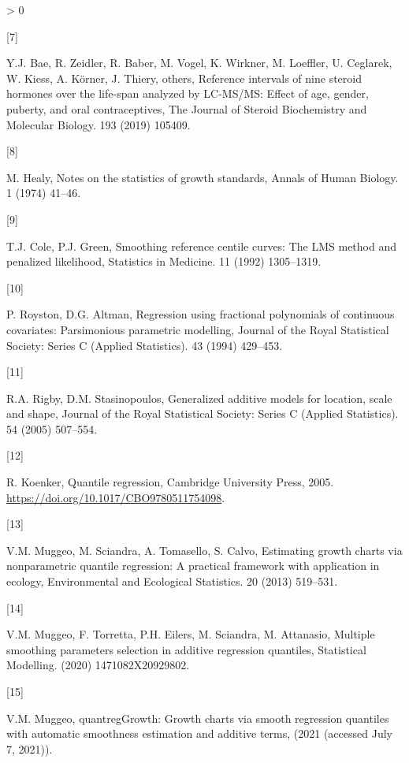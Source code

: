 \documentclass[]{elsarticle} %
\newlength{\csllabelwidth}
\newlength{\cslhangindent}
\newenvironment{CSLReferences}[3] %
 {%
  \setlength{\parindent}{0pt}
  \ifodd #1 \everypar{\setlength{\hangindent}{\cslhangindent}}\ignorespaces\fi
  \ifnum #2 > 0
  \setlength{\parskip}{#2\baselineskip}
  \fi
 }%
 {}
\newcommand{\CSLLeftMargin}[1]{\parbox[t]{\csllabelwidth}{#1}}
\newcommand{\CSLRightInline}[1]{\parbox[t]{\linewidth - \csllabelwidth}{#1}}
\begin{document}
\begin{CSLReferences}{0}{0}
\leavevmode\hypertarget{ref-bae2019reference}{}%
\CSLLeftMargin{{[}7{]} }
\CSLRightInline{Y.J. Bae, R. Zeidler, R. Baber, M. Vogel, K. Wirkner, M.
Loeffler, U. Ceglarek, W. Kiess, A. Körner, J. Thiery, others, Reference
intervals of nine steroid hormones over the life-span analyzed by
LC-MS/MS: Effect of age, gender, puberty, and oral contraceptives, The
Journal of Steroid Biochemistry and Molecular Biology. 193 (2019)
105409.}

\leavevmode\hypertarget{ref-healy1974notes}{}%
\CSLLeftMargin{{[}8{]} }
\CSLRightInline{M. Healy, Notes on the statistics of growth standards,
Annals of Human Biology. 1 (1974) 41--46.}

\leavevmode\hypertarget{ref-cole1992smoothing}{}%
\CSLLeftMargin{{[}9{]} }
\CSLRightInline{T.J. Cole, P.J. Green, Smoothing reference centile
curves: The LMS method and penalized likelihood, Statistics in Medicine.
11 (1992) 1305--1319.}

\leavevmode\hypertarget{ref-royston1994regression}{}%
\CSLLeftMargin{{[}10{]} }
\CSLRightInline{P. Royston, D.G. Altman, Regression using fractional
polynomials of continuous covariates: Parsimonious parametric modelling,
Journal of the Royal Statistical Society: Series C (Applied Statistics).
43 (1994) 429--453.}

\leavevmode\hypertarget{ref-rigby2005generalized}{}%
\CSLLeftMargin{{[}11{]} }
\CSLRightInline{R.A. Rigby, D.M. Stasinopoulos, Generalized additive
models for location, scale and shape, Journal of the Royal Statistical
Society: Series C (Applied Statistics). 54 (2005) 507--554.}

\leavevmode\hypertarget{ref-koenker_2005}{}%
\CSLLeftMargin{{[}12{]} }
\CSLRightInline{R. Koenker, Quantile regression, Cambridge University
Press, 2005. \url{https://doi.org/10.1017/CBO9780511754098}.}

\leavevmode\hypertarget{ref-muggeo2013estimating}{}%
\CSLLeftMargin{{[}13{]} }
\CSLRightInline{V.M. Muggeo, M. Sciandra, A. Tomasello, S. Calvo,
Estimating growth charts via nonparametric quantile regression: A
practical framework with application in ecology, Environmental and
Ecological Statistics. 20 (2013) 519--531.}

\leavevmode\hypertarget{ref-muggeo2020multiple}{}%
\CSLLeftMargin{{[}14{]} }
\CSLRightInline{V.M. Muggeo, F. Torretta, P.H. Eilers, M. Sciandra, M.
Attanasio, Multiple smoothing parameters selection in additive
regression quantiles, Statistical Modelling. (2020) 1471082X20929802.}

\leavevmode\hypertarget{ref-quantreggrowth}{}%
\CSLLeftMargin{{[}15{]} }
\CSLRightInline{V.M. Muggeo, quantregGrowth: Growth charts via smooth
regression quantiles with automatic smoothness estimation and additive
terms, (2021 (accessed July 7, 2021)).}


\end{CSLReferences}
\end{document}
